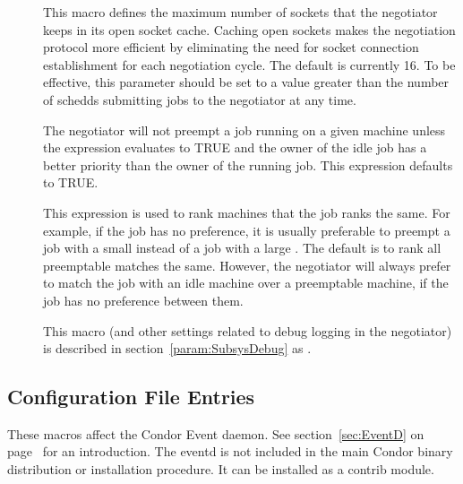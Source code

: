 \begin{description}
\item[]
  \label{param:NegotiatorSocketCacheSize} This macro defines the
  maximum number of sockets that the negotiator keeps in its
  open socket cache.  Caching open sockets makes the negotiation
  protocol more efficient by eliminating the need for socket
  connection establishment for each negotiation cycle.  The default is
  currently 16.  To be effective, this parameter should be set to a
  value greater than the number of schedds submitting jobs to the
  negotiator at any time.

\item[]
  \label{param:PreemptionRequirements} The negotiator will not preempt
  a job running on a given machine unless the
   expression evaluates to TRUE and the
  owner of the idle job has a better priority than the owner of the
  running job.  This expression defaults to TRUE.

\item[] \label{param:PreemptionRank} This
  expression is used to rank machines that the job ranks the same.
  For example, if the job has no preference, it is usually preferable
  to preempt a job with a small  instead of a job with a
  large .  The default is to rank all preemptable matches the
  same.  However, the negotiator will always prefer to match the job
  with an idle machine over a preemptable machine, if the job has no
  preference between them.

\item[] \label{param:NegotiatorDebug} This macro
  (and other settings related to debug logging in the negotiator) is
  described in section~\ref{param:SubsysDebug} as .

\end{description}

\subsection{\label{sec:Eventd-Config-File-Entries}
 Configuration File Entries}

These macros affect the Condor Event daemon.  See
section~\ref{sec:EventD} on page~\pageref{sec:EventD} for an
introduction.  The eventd is not included in the main Condor binary
distribution or installation procedure.  It can be installed as a
contrib module.

